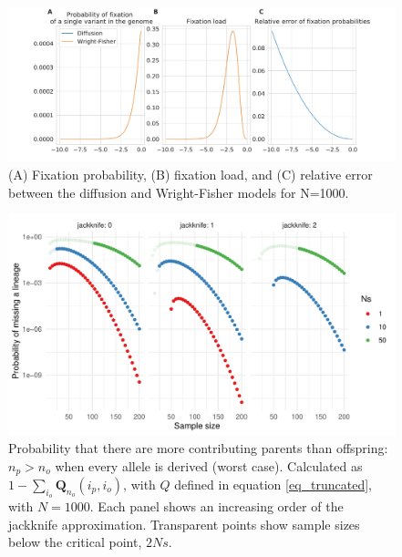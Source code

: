 \documentclass[9pt,twocolumn,twoside,lineno]{gsajnl}
\begin{document}
\begin{figure}
  \centering
  \includegraphics[width=\columnwidth]{fig/fixation_rate_N_1000.pdf}

    \caption{(A) Fixation probability, (B) fixation load, and (C) relative error between the
    diffusion and Wright-Fisher models for N=1000.}

  \label{fig_apx_fixation_1000}

\end{figure}

\begin{figure}
  \centering
  \includegraphics[width=\columnwidth]{fig/missing.pdf}

  \caption{Probability that there are more contributing parents than offspring: $n_p > n_o$ when
    every allele is derived (worst case). Calculated as $1-\sum_{i_o} \mathbf{Q}_{n_o}{(i_p,
    i_o)}$, with $Q$ defined in equation \ref{eq_truncated}, with $N=1000$. Each panel shows an
    increasing order of the jackknife approximation. Transparent points show sample sizes below the
    critical point, $2Ns$.}

  \label{fig_apx_missing}
\end{figure}
\end{document}
